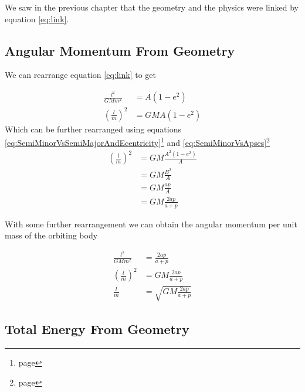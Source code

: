 We saw in the previous chapter that the geometry and the physics were linked by equation \ref{eq:link}.

\subsection{Angular Momentum From Geometry}

We can rearrange equation \ref{eq:link} to get

\begin{align}
\frac{l^2}{GMm^2} &= A(1-e^2)\nonumber \\
\left(\frac{l}{m} \right)^2 & = GM A(1-e^2) \label{eq:Connection1}
\end{align}
Which can be further rearranged using equations \ref{eq:SemiMinorVsSemiMajorAndEcentricity}\footnote{page \pageref{eq:SemiMinorVsSemiMajorAndEcentricity}} and \ref{eq:SemiMinorVsApses}\footnote{page \pageref{eq:SemiMinorVsApses}}
\begin{align}
\left(\frac{l}{m} \right)^2 &= GM\frac{A^2(1-e^2)}{A} \nonumber \\
&= GM\frac{B^2}{A} \nonumber \\
&= GM\frac{ap}{A} \nonumber \\
&=GM\frac{2ap}{a+p} \label{eq:Connection1}
\end{align}

With some further rearrangement we can obtain the angular momentum per unit mass of the orbiting body

\begin{align}
\frac{l^2}{GMm^2} &=\frac{2ap}{a+p} \nonumber \\
\left(\frac{l}{m}\right)^2 &= GM \frac{2ap}{a+p} \nonumber \\
\frac{l}{m}&=\sqrt{GM  \frac{2ap}{a+p}}
\end{align}

\subsection{Total Energy From Geometry}

